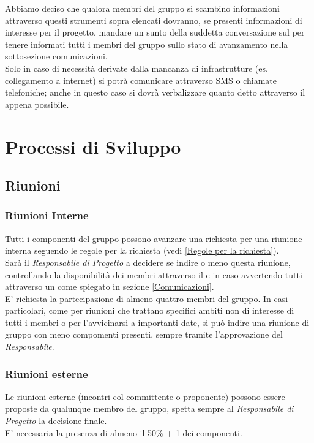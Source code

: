\documentclass{scalatekids-article}
\begin{document}
Abbiamo deciso che qualora membri del gruppo si scambino informazioni attraverso
questi strumenti sopra elencati dovranno, se presenti informazioni di interesse
per il progetto, mandare un sunto della suddetta conversazione sul 
per tenere informati tutti i membri del gruppo sullo stato di avanzamento nella
sottosezione comunicazioni.\\ Solo in caso di necessità derivate dalla mancanza
di infrastrutture (es. collegamento a internet) si potrà comunicare attraverso
SMS o chiamate telefoniche; anche in questo caso si dovrà verbalizzare quanto
detto attraverso il  appena possibile.

\section{Processi di Sviluppo}
\subsection{Riunioni}
\subsubsection{Riunioni Interne}
Tutti i componenti del gruppo possono avanzare una richiesta per una riunione
interna seguendo le regole per la richiesta (vedi \ref{Regole per la
  richiesta}).\\ Sarà il \textit{Responsabile di Progetto} a decidere se indire
o meno questa riunione, controllando la disponibilità dei membri attraverso il
 e in caso avvertendo tutti attraverso un  come
spiegato in sezione \ref{Comunicazioni}.\\ E' richiesta la partecipazione di
almeno quattro membri del gruppo. In casi particolari, come per riunioni che
trattano specifici ambiti non di interesse di tutti i membri o per l'avvicinarsi
a importanti date, si può indire una riunione di gruppo con meno compomenti
presenti, sempre tramite l'approvazione del \textit{Responsabile}.

\subsubsection{Riunioni esterne}
Le riunioni esterne (incontri col committente o proponente) possono essere
proposte da qualunque membro del gruppo, spetta sempre al \textit{Responsabile
  di Progetto} la decisione finale.\\ E' necessaria la presenza di almeno il
50\% + 1 dei componenti.
\end{document}
